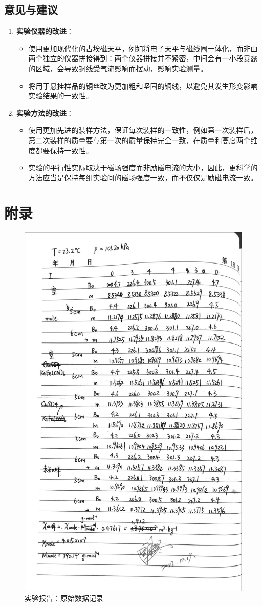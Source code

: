 \documentclass[cn,hazy,pku,12pt,normal,math=newtx,cite=super]{elegantnote}
\begin{document}
\subsection{意见与建议}
\begin{enumerate}
    \item \textbf{实验仪器的改进}：
    \begin{itemize}
        \item 使用更加现代化的古埃磁天平，例如将电子天平与磁线圈一体化，而非由两个独立的仪器拼接得到：两个仪器拼接并不紧密，中间会有一小段暴露的区域，会导致铜线受气流影响而摆动，影响实验测量。
        \item 将用于悬挂样品的铜丝改为更加粗和坚固的铜线，以避免其发生形变影响实验结果的一致性。
    \end{itemize}
    \item \textbf{实验方法的改进}：
    \begin{itemize}
        \item 使用更加先进的装样方法，保证每次装样的一致性，例如第一次装样后，第二次装样的质量要与第一次的质量保持完全一致，在质量和高度两个维度都要保持一致性。
        \item 实验的平行性实际取决于磁场强度而非励磁电流的大小，因此，更科学的方法应当是保持每组实验间的磁场强度一致，而不仅仅是励磁电流一致。
    \end{itemize}
\end{enumerate}

\nocite{*}


\newpage
\section*{附录}
\begin{figure}[H]
    \centering
    \includegraphics[width=.7\textwidth]{figures/0-4.jpg}
    \caption*{实验报告：原始数据记录}
\end{figure}
\end{document}
